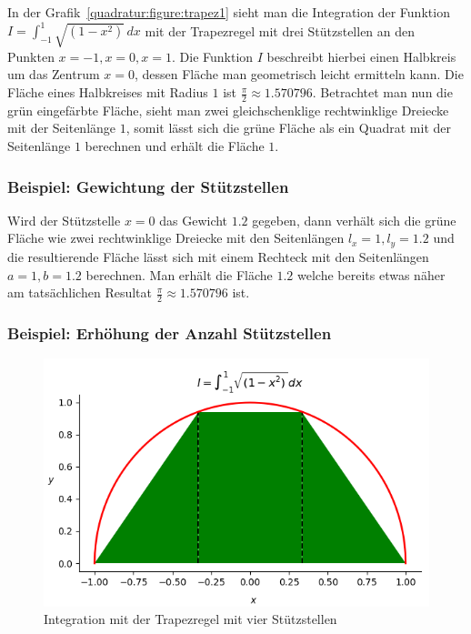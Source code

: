 In der Grafik~\ref{quadratur:figure:trapez1} sieht man die Integration der Funktion $I = \int_{-1}^{1}\sqrt{(1-x^2)}\,dx$
mit der Trapezregel mit drei Stützstellen an den Punkten $x=-1, x=0, x=1$.
Die Funktion $I$ beschreibt hierbei einen Halbkreis um das Zentrum $x=0$, 
dessen Fläche man geometrisch leicht ermitteln kann.
Die Fläche eines Halbkreises mit Radius $1$ ist $\frac{\pi}{2} \approx 1.570796$.
Betrachtet man nun die grün eingefärbte Fläche, sieht man zwei gleichschenklige rechtwinklige Dreiecke mit der Seitenlänge $1$,
somit lässt sich die grüne Fläche als ein Quadrat mit der Seitenlänge $1$ berechnen und erhält die Fläche $1$.

\newpage

\subsubsection{Beispiel: Gewichtung der Stützstellen}
Wird der Stützstelle $x=0$ das Gewicht $1.2$ gegeben, dann verhält sich die grüne Fläche wie zwei rechtwinklige Dreiecke 
mit den Seitenlängen $l_{x}=1, l_{y}=1.2$ und die resultierende Fläche lässt sich mit einem Rechteck mit den Seitenlängen
$a=1, b=1.2$ berechnen.
Man erhält die Fläche $1.2$ welche bereits etwas näher am tatsächlichen Resultat $\frac{\pi}{2} \approx 1.570796$ ist.

\subsubsection{Beispiel: Erhöhung der Anzahl Stützstellen}

\begin{figure}[!h]
    \centering
    \includegraphics[scale=0.7]{papers/quadratur/figures/GaussTrapez2}
    \caption{Integration mit der Trapezregel mit vier Stützstellen
    \label{quadratur:figure:trapez2}}  
\end{figure}

